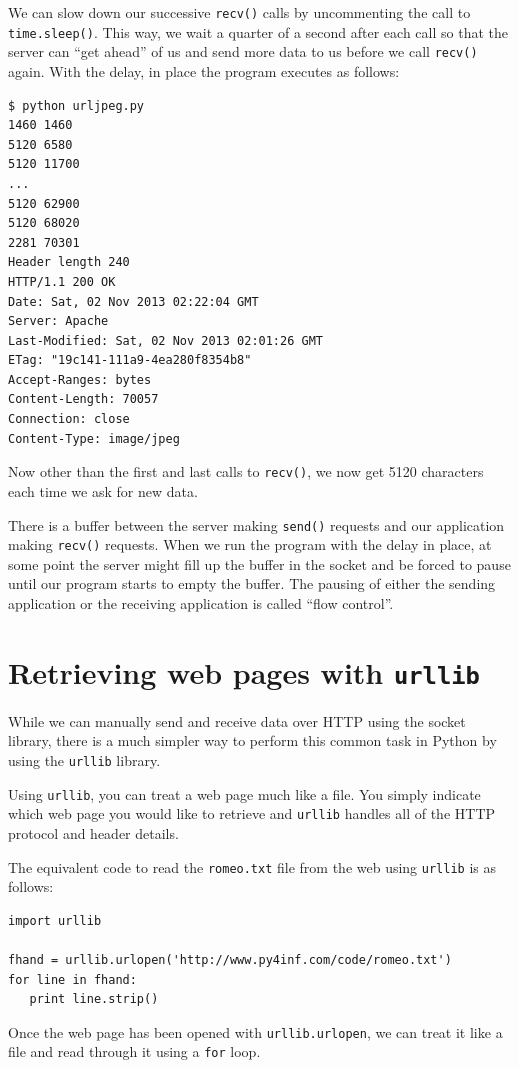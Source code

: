 We can slow down our successive {\tt recv()} calls by uncommenting the call 
to {\tt time.sleep()}.  This way, we wait a quarter of a second after each call
so that the server can ``get ahead'' of us and send more data to us
before we call {\tt recv()} again.  With the delay, in place the program 
executes as follows:
\beforeverb
\begin{verbatim}
$ python urljpeg.py 
1460 1460
5120 6580
5120 11700
...
5120 62900
5120 68020
2281 70301
Header length 240
HTTP/1.1 200 OK
Date: Sat, 02 Nov 2013 02:22:04 GMT
Server: Apache
Last-Modified: Sat, 02 Nov 2013 02:01:26 GMT
ETag: "19c141-111a9-4ea280f8354b8"
Accept-Ranges: bytes
Content-Length: 70057
Connection: close
Content-Type: image/jpeg
\end{verbatim}
\afterverb
%
Now other than the first and last calls to {\tt recv()}, we now get 
5120 characters each time we ask for new data.  

There is a buffer between the server making {\tt send()} requests 
and our application making {\tt recv()} requests.  When we run the 
program with the delay in place, at some point the server might 
fill up the buffer in the socket and be forced to pause until our
program starts to empty the buffer.  The pausing of either the 
sending application or the receiving application is called 
``flow control''.

\section{Retrieving web pages with {\tt urllib}}

While we can manually send and receive data over HTTP 
using the socket library, there is a much simpler way to 
perform this common task in Python by 
using the {\tt urllib} library.

Using {\tt urllib},
you can treat a web page much like a file.   You simply
indicate which web page you would like to retrieve and
{\tt urllib} handles all of the HTTP protocol and header 
details.

The equivalent code to read the {\tt romeo.txt} file
from the web using {\tt urllib} is as follows:

\beforeverb
\begin{verbatim}
import urllib

fhand = urllib.urlopen('http://www.py4inf.com/code/romeo.txt')
for line in fhand:
   print line.strip()
\end{verbatim}
\afterverb
%
Once the web page has been opened with 
{\tt urllib.urlopen}, we can treat it like 
a file and read through it using a 
{\tt for} loop.   

